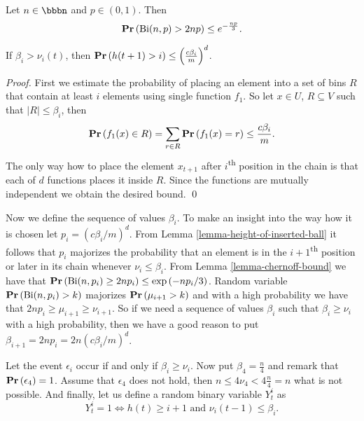 \documentclass[runningheads,a4paper]{llncs}
\begin{document}
\begin{lemma}
\label{lemma-chernoff-bound}
Let $n \in \bbbn$ and $p \in (0, 1)$. Then $$\mathbf{Pr}\left(\mathrm{Bi}(n, p) > 2np\right) \leq e ^ {- \frac{np}{3}} \textit{.}$$
\end{lemma}

\begin{lemma}
\label{lemma-height-of-inserted-ball}
If $\beta_i > \nu_i(t)$, then $\mathbf{Pr}\left(h(t + 1) > i\right) \leq \left(\frac{c\beta_i}{m}\right) ^ d$.
\end{lemma}
\begin{proof}
First we estimate the probability of placing an element into a set of bins $R$ that contain at least $i$ elements using single function $f_1$. So let $x \in U$, $R \subseteq V$ such that $|R| \leq \beta_i$, then $$\mathbf{Pr}\left(f_1(x) \in R\right) = \displaystyle\sum_{r \in R} \mathbf{Pr}\left(f_1(x) = r\right) \leq \frac{c\beta_i}{m}.$$
The only way how to place the element $x_{t + 1}$ after $i$\textsuperscript{th} position in the chain is that each of $d$ functions places it inside $R$. Since the functions are mutually independent we obtain the desired bound.
\qed
\end{proof}

Now we define the sequence of values $\beta_i$. To make an insight into the way how it is chosen let $p_i = \left({c\beta_i}/{m}\right) ^ d$. From Lemma \ref{lemma-height-of-inserted-ball} it follows that $p_i$ majorizes the probability that an element is in the $i + 1$\textsuperscript{th} position or later in its chain whenever $\nu_i \leq \beta_i$. From Lemma \ref{lemma-chernoff-bound} we have that $\mathbf{Pr}\left(\mathrm{Bi}(n, p_i) \geq 2np_i\right) \leq \exp\left({-np_i}/{3}\right)$. Random variable $\mathbf{Pr}\left(\mathrm{Bi}(n, p_i) > k\right)$ majorizes $\mathbf{Pr}\left(\mu_{i + 1} > k\right)$ and with a high probability we have that $2np_i \geq \mu_{i + 1} \geq \nu_{i + 1}$. So if we need a sequence of values $\beta_i$ such that $\beta_i \geq \nu_{i}$ with a high probability, then we have a good reason to put $\beta_{i + 1} = 2np_i = 2n\left({c\beta_i}/{m}\right) ^ d$.

Let the event $\epsilon_i$ occur if and only if $\beta_i \geq \nu_i$. Now put $\beta_4 = \frac{n}{4}$ and remark that $\mathbf{Pr}\left(\epsilon_4\right) = 1$. Assume that $\epsilon_4$ does not hold, then $n \leq 4 \nu_4 < 4 \frac{n}{4} = n$ what is not possible. And finally, let us define a random binary variable $Y_t^i$ as $$Y_t^i = 1 \Leftrightarrow h(t) \geq i + 1 \mbox{ and } \nu_i(t - 1) \leq \beta_i \textit{.}$$
\end{document}
